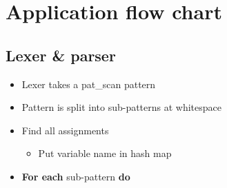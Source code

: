 \documentclass[12pt]{article}
\newcounter{subsubsubsection}[subsubsection]
\begin{document}


\section{Application flow chart}

\subsection{Lexer \& parser}

\begin{itemize}
	\item Lexer takes a pat\_scan pattern
	\item Pattern is split into sub-patterns at whitespace
	\item Find all assignments
	\begin{itemize}
		\item Put variable name in hash map
	\end{itemize}
	\item \textbf{For each} sub-pattern \textbf{do}
\end{itemize}



\newpage


\nocite{*}

\end{document}
